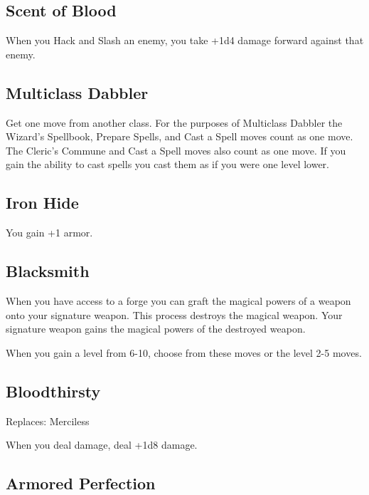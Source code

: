  
\subsection{Scent of Blood}    
 

When you Hack and Slash an enemy, you take +1d4 damage forward against that enemy.

 
\subsection{Multiclass Dabbler}    
 

Get one move from another class. For the purposes of Multiclass Dabbler the Wizard's Spellbook, Prepare Spells, and Cast a Spell moves count as one move. The Cleric's Commune and Cast a Spell moves also count as one move. If you gain the ability to cast spells you cast them as if you were one level lower.

 
\subsection{Iron Hide}    
 

You gain +1 armor.

 
\subsection{Blacksmith}   
 

When you have access to a forge you can graft the magical powers of a weapon onto your signature weapon. This process destroys the magical weapon. Your signature weapon gains the magical powers of the destroyed weapon.

 
\startInstructions
When you gain a level from 6-10, choose from these moves or the level 2-5 moves.
\stopInstructions
 
\subsection{Bloodthirsty}   
 

Replaces: Merciless

 

When you deal damage, deal +1d8 damage.

 
\subsection{Armored Perfection}    
 

